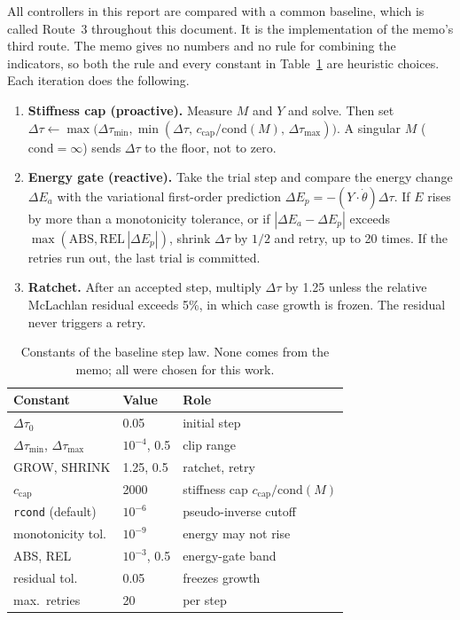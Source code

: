 \documentclass[aps,pra,reprint,superscriptaddress,nofootinbib]{revtex4-2}
\newcommand{\dt}{\Delta\tau}
\newcommand{\thetadot}{\dot\theta}
\newcommand{\cond}{\mathrm{cond}}
\newcommand{\rcond}{\texttt{rcond}}
\begin{document}
All controllers in this report are compared with a common baseline, which is called Route~3 throughout this document.
It is the implementation of the memo's third route. The memo gives no numbers and no rule for
combining the indicators, so both the rule and every constant in Table~\ref{tab:constants} are
heuristic choices. Each iteration does the following.
\begin{enumerate}
\setlength\itemsep{0pt}
\item \textbf{Stiffness cap (proactive).} Measure $M$ and $Y$ and solve. Then set
  $\dt\leftarrow\max\!\big(\dt_{\min},\min(\dt,\,c_{\mathrm{cap}}/\cond(M),\,\dt_{\max})\big)$.
  A singular $M$ ($\cond=\infty$) sends $\dt$ to the floor, not to zero.
\item \textbf{Energy gate (reactive).} Take the trial step and compare the energy change
  $\Delta E_a$ with the variational first-order prediction $\Delta E_p=-(Y\cdot\thetadot)\dt$.
  If $E$ rises by more than a monotonicity tolerance, or if $|\Delta E_a-\Delta E_p|$ exceeds
  $\max(\text{ABS},\text{REL}\,|\Delta E_p|)$, shrink $\dt$ by $1/2$ and retry, up to 20 times.
  If the retries run out, the last trial is committed.
\item \textbf{Ratchet.} After an accepted step, multiply $\dt$ by 1.25 unless the relative
  McLachlan residual exceeds 5\%, in which case growth is frozen. The residual never triggers
  a retry.
\end{enumerate}

\begin{table}[b]
\caption{Constants of the baseline step law. None comes from the memo; all were chosen for this work.}
\label{tab:constants}
\begin{ruledtabular}
\begin{tabular}{lll}
Constant & Value & Role \\
\midrule
$\dt_0$ & 0.05 & initial step \\
$\dt_{\min}$, $\dt_{\max}$ & $10^{-4}$, 0.5 & clip range \\
GROW, SHRINK & 1.25, 0.5 & ratchet, retry \\
$c_{\mathrm{cap}}$ & 2000 & stiffness cap $c_{\mathrm{cap}}/\cond(M)$ \\
\rcond{} (default) & $10^{-6}$ & pseudo-inverse cutoff \\
monotonicity tol. & $10^{-9}$ & energy may not rise \\
ABS, REL & $10^{-3}$, 0.5 & energy-gate band \\
residual tol. & 0.05 & freezes growth \\
max.\ retries & 20 & per step \\
\end{tabular}
\end{ruledtabular}
\end{table}
\end{document}
